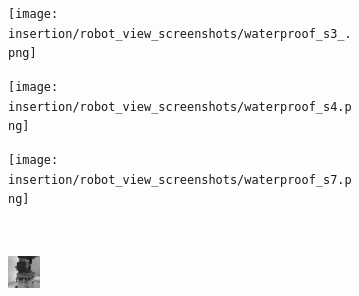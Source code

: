 \begin{figure}[thb]
\begin{subfigure}[b]{0.20\linewidth}
        \centering
    \end{subfigure} \hfill
    \begin{subfigure}[b]{0.20\linewidth}
        \texttt{[image: insertion/robot\_view\_screenshots/waterproof\_s3\_.png]}\\
        \centering
    \end{subfigure}     \hfill
    \begin{subfigure}[b]{0.20\linewidth}
        \texttt{[image: insertion/robot\_view\_screenshots/waterproof\_s4.png]}\\
        \centering
    \end{subfigure}  \hfill
    \begin{subfigure}[b]{0.20\linewidth}
        \texttt{[image: insertion/robot\_view\_screenshots/waterproof\_s7.png]}\\
        \centering
    \end{subfigure}    
    \\
    \vspace{10pt}
    \begin{subfigure}[b]{0.20\linewidth}
        \includegraphics[width=0.99\linewidth]{insertion/robot_view_screenshots/water_target_image1.png}\\
        \centering
    \end{subfigure} \hfill
    \begin{subfigure}[b]{0.20\linewidth}

\end{subfigure}
\end{figure}
